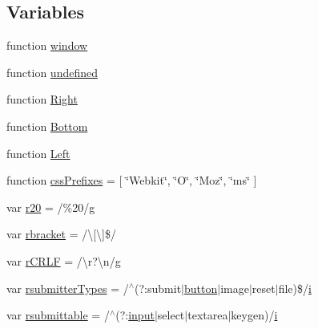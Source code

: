 \subsection*{Variables}
\begin{DoxyCompactItemize}
\item 
function \hyperlink{_scripts_2jquery-1_810_82_8js_a04a8a2bbfa9c15500892b8e5033d625b}{window}
\item 
function \hyperlink{_scripts_2jquery-1_810_82_8js_a08113a236cc18d2a9d5ce27e638012be}{undefined}
\item 
function \hyperlink{_scripts_2jquery-1_810_82_8js_ac7f66efc33d974809d85fc5bdb00c6eb}{Right}
\item 
function \hyperlink{_scripts_2jquery-1_810_82_8js_aff76c1cba4a00c678dfce0e0c5a5538a}{Bottom}
\item 
function \hyperlink{_scripts_2jquery-1_810_82_8js_abef68bf244a1159a49fe3a2c153a65d2}{Left}
\item 
function \hyperlink{_scripts_2jquery-1_810_82_8js_a2ed3892172b336458b8074254f4471da}{css\+Prefixes} = \mbox{[} \char`\"{}Webkit\char`\"{}, \char`\"{}O\char`\"{}, \char`\"{}Moz\char`\"{}, \char`\"{}ms\char`\"{} \mbox{]}
\item 
var \hyperlink{_scripts_2jquery-1_810_82_8js_a0e39f72d512af99fb5992d66f1a1c821}{r20} = /\%20/\hyperlink{jquery_8unobtrusive-ajax_8min_8js_abdf64181dd0fecc8ac45c3cfa81562b1}{g}
\item 
var \hyperlink{_scripts_2jquery-1_810_82_8js_a07117e28ee58d2d2664cfbaf741e10c1}{rbracket} = /\textbackslash{}\mbox{[}\textbackslash{}\mbox{]}\$/
\item 
var \hyperlink{_scripts_2jquery-1_810_82_8js_a4fd9dfc4eb645b441a3e84730c50154b}{r\+C\+R\+L\+F} = /\textbackslash{}r?\textbackslash{}n/\hyperlink{jquery_8unobtrusive-ajax_8min_8js_abdf64181dd0fecc8ac45c3cfa81562b1}{g}
\item 
var \hyperlink{_scripts_2jquery-1_810_82_8js_a0e9cd4ca08945afe827846f34a36c74a}{rsubmitter\+Types} = /$^\wedge$(?\+:submit$\vert$\hyperlink{_scripts_2bootstrap_8min_8js_a55e170814e74f6c3db8ae9ea3ba9054f}{button}$\vert$image$\vert$reset$\vert$file)\$/\hyperlink{jquery_8unobtrusive-ajax_8min_8js_a84da5ff1aa6008a770fb28040f6b0569}{i}
\item 
var \hyperlink{_scripts_2jquery-1_810_82_8js_a12d248d7e6c5985c5ea21f56fbef9e90}{rsubmittable} = /$^\wedge$(?\+:\hyperlink{jquery_8unobtrusive-ajax_8min_8js_a22211e450825dd03852dfba097324407}{input}$\vert$select$\vert$textarea$\vert$keygen)/\hyperlink{jquery_8unobtrusive-ajax_8min_8js_a84da5ff1aa6008a770fb28040f6b0569}{i}

\end{DoxyCompactItemize}
